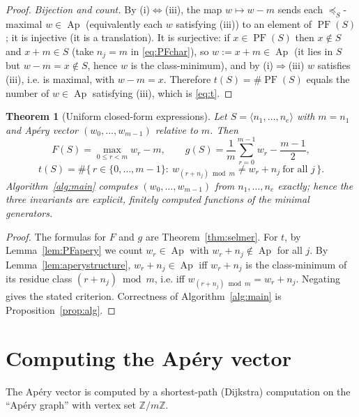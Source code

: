 \documentclass{amsart}
\newtheorem{theorem}{Theorem}
\theoremstyle{definition}
\DeclareMathOperator{\Ap}{Ap}
\DeclareMathOperator{\PF}{PF}
\newcommand{\ZZ}{\mathbb{Z}}
\begin{document}
\begin{proof}
\emph{Bijection and count.} By (i)$\Leftrightarrow$(iii), the map
$w\mapsto w-m$ sends each $\preceq_S$-maximal $w\in\Ap$ (equivalently each
$w$ satisfying (iii)) to an element of $\PF(S)$; it is injective (it is a
translation). It is surjective: if $x\in\PF(S)$ then $x\notin S$ and
$x+m\in S$ (take $n_j=m$ in \eqref{eq:PFchar}), so $w:=x+m\in\Ap$ (it lies
in $S$ but $w-m=x\notin S$, hence $w$ is the class-minimum), and by
(i)$\Rightarrow$(iii) $w$ satisfies (iii), i.e. is maximal, with
$w-m=x$. Therefore $t(S)=\#\PF(S)$ equals the number of $w\in\Ap$
satisfying (iii), which is \eqref{eq:t}.
\end{proof}

\begin{theorem}[Uniform closed-form expressions]\label{thm:apery}
Let $S=\langle n_1,\dots,n_e\rangle$ with $m=n_1$ and Ap\'ery vector
$(w_0,\dots,w_{m-1})$ relative to $m$. Then
\[
F(S)=\max_{0\le r<m}w_r-m,\qquad
g(S)=\frac1m\sum_{r=0}^{m-1}w_r-\frac{m-1}{2},
\]
\[
t(S)=\#\bigl\{\,r\in\{0,\dots,m-1\}:\ w_{(r+n_j)\bmod m}\ne w_r+n_j\
\text{for all }j\,\bigr\}.
\]
Algorithm~\ref{alg:main} computes $(w_0,\dots,w_{m-1})$ from
$n_1,\dots,n_e$ exactly; hence the three invariants are explicit, finitely
computed functions of the minimal generators.
\end{theorem}

\begin{proof}
The formulas for $F$ and $g$ are Theorem~\ref{thm:selmer}. For $t$, by
Lemma~\ref{lem:PFapery} we count $w_r\in\Ap$ with $w_r+n_j\notin\Ap$ for all
$j$. By Lemma~\ref{lem:aperystructure}, $w_r+n_j\in\Ap$ iff $w_r+n_j$ is the
class-minimum of its residue class $(r+n_j)\bmod m$, i.e. iff
$w_{(r+n_j)\bmod m}=w_r+n_j$. Negating gives the stated criterion.
Correctness of Algorithm~\ref{alg:main} is Proposition~\ref{prop:alg}.
\end{proof}

\section{Computing the Ap\'ery vector}

The Ap\'ery vector is computed by a shortest-path (Dijkstra) computation on
the ``Ap\'ery graph'' with vertex set $\ZZ/m\ZZ$.
\end{document}
